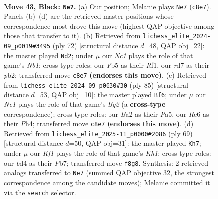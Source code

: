 \documentclass[11pt]{article}
\begin{document}
\clearpage

\begin{figure}[p]\centering
\begin{subfigure}{0.46\textwidth}\centering
\resizebox{\linewidth}{!}{%
\newchessgame
\chessboard[
  setfen={2n2k2/3R4/2r5/1p4p1/r2B4/4P1P1/b4P1P/4R1K1 b - - 5 43},
  showmover=false,
  pgfstyle=straightmove, color=movearrow, markmove={c8-e7}
]}
\caption{}
\end{subfigure}\hfill
\begin{subfigure}{0.46\textwidth}\centering
\resizebox{\linewidth}{!}{%
\newchessgame
\chessboard[
  setfen={7r/1R2b2p/5ppk/8/2BpP3/8/1p5r/1N1K1R2 w - - 1 37},
  showmover=false,
  pgfstyle=straightmove, color=movearrow, markmove={b1-d2}
]}
\caption{}
\end{subfigure}
\\[4pt]
\begin{subfigure}{0.46\textwidth}\centering
\resizebox{\linewidth}{!}{%
\newchessgame
\chessboard[
  setfen={8/5Rb1/4p3/p2r2k1/7p/1P1BP3/P3KP2/8 b - - 0 43},
  showmover=false,
  pgfstyle=straightmove, color=movearrow, markmove={g7-f6}
]}
\caption{}
\end{subfigure}\hfill
\begin{subfigure}{0.46\textwidth}\centering
\resizebox{\linewidth}{!}{%
\newchessgame
\chessboard[
  setfen={3r1b1k/1p3r2/1R4p1/7p/4RB2/6P1/5PKP/8 b - - 3 35},
  showmover=false,
  pgfstyle=straightmove, color=movearrow, markmove={h8-h7}
]}
\caption{}
\end{subfigure}
\caption{\textbf{Move 43, Black: \texttt{Ne7}.} (a) Our position; Melanie plays \texttt{Ne7} (\texttt{c8e7}). Panels (b)--(d) are the retrieved master positions whose correspondence most drove this move (highest QAP objective among those that transfer to it). (b) Retrieved from \texttt{lichess\_elite\_2024-09\_p0019\#3495} (ply 72) [structural distance $d$=48, QAP obj=22]: the master played \texttt{Nd2}; under $\mu$ our \emph{Nc1} plays the role of that game's \emph{Nb1}; cross-type roles: our \emph{P}b5 as their \emph{R}f1, our \emph{r}d7 as their \emph{p}b2; transferred move \texttt{c8e7} \textbf{(endorses this move)}. (c) Retrieved from \texttt{lichess\_elite\_2024-09\_p0030\#30} (ply 85) [structural distance $d$=53, QAP obj=10]: the master played \texttt{Bf6}; under $\mu$ our \emph{Nc1} plays the role of that game's \emph{Bg2} (a \textbf{cross-type} correspondence); cross-type roles: our \emph{B}a2 as their \emph{P}a5, our \emph{R}c6 as their \emph{P}h4; transferred move \texttt{c8e7} \textbf{(endorses this move)}. (d) Retrieved from \texttt{lichess\_elite\_2025-11\_p0000\#2086} (ply 69) [structural distance $d$=50, QAP obj=31]: the master played \texttt{Kh7}; under $\mu$ our \emph{Kf1} plays the role of that game's \emph{Kh1}; cross-type roles: our \emph{b}d4 as their \emph{P}b7; transferred move \texttt{f8g8}. Synthesis: 2 retrieved analogs transferred to \texttt{Ne7} (summed QAP objective 32, the strongest correspondence among the candidate moves); Melanie committed it via the \texttt{search} selector.}
\label{fig:thought-m85}
\end{figure}
\end{document}
